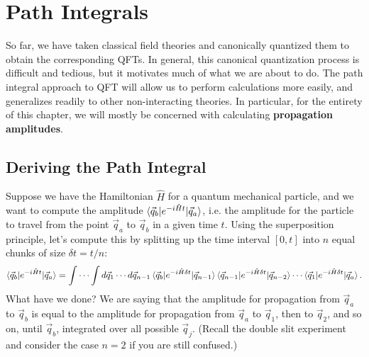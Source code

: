 \documentclass{report}
\theoremstyle{plain}
\theoremstyle{definition}
\theoremstyle{remark}
\begin{document}
\chapter{Path Integrals}

So far, we have taken classical field theories and canonically
quantized them to obtain the corresponding QFTs. In general, this
canonical quantization process is difficult and tedious, but it
motivates much of what we are about to do. The path integral approach
to QFT will allow us to perform calculations more easily, and
generalizes readily to other non-interacting theories. In particular,
for the entirety of this chapter, we will mostly be concerned with
calculating {\bf propagation amplitudes}.

\section{Deriving the Path Integral}

Suppose we have the Hamiltonian $\hat{H}$ for a quantum mechanical
particle, and we want to compute the amplitude
$\braket{\vec{q}_b|e^{-i\hat{H}t}|\vec{q}_a}$, i.e. the amplitude for
the particle to travel from the point $\vec{q}_a$ to $\vec{q}_b$ in a
given time $t$. Using the superposition principle, let's compute this
by splitting up the time interval $[0, t]$ into $n$ equal chunks of
size $\delta t = t/n$:
$$ \braket{\vec{q}_b|e^{-i\hat{H}t}|\vec{q}_a} = \int \cdots \int d\vec{q}_1 \cdots d\vec{q}_{n-1} \braket{\vec{q}_b|e^{-i\hat{H}\delta t}|\vec{q}_{n-1}} \braket{\vec{q}_{n-1}|e^{-i\hat{H}\delta t}|\vec{q}_{n-2}} \cdots \braket{\vec{q}_1|e^{-i\hat{H}\delta t}|\vec{q}_a}. $$
What have we done? We are saying that the amplitude for propagation
from $\vec{q}_a$ to $\vec{q}_b$ is equal to the amplitude for
propagation from $\vec{q}_a$ to $\vec{q}_1$, then to $\vec{q}_2$, and
so on, until $\vec{q}_b$, integrated over all possible $\vec{q}_j$.
(Recall the double slit experiment and consider the case $n = 2$ if
you are still confused.)
\end{document}
